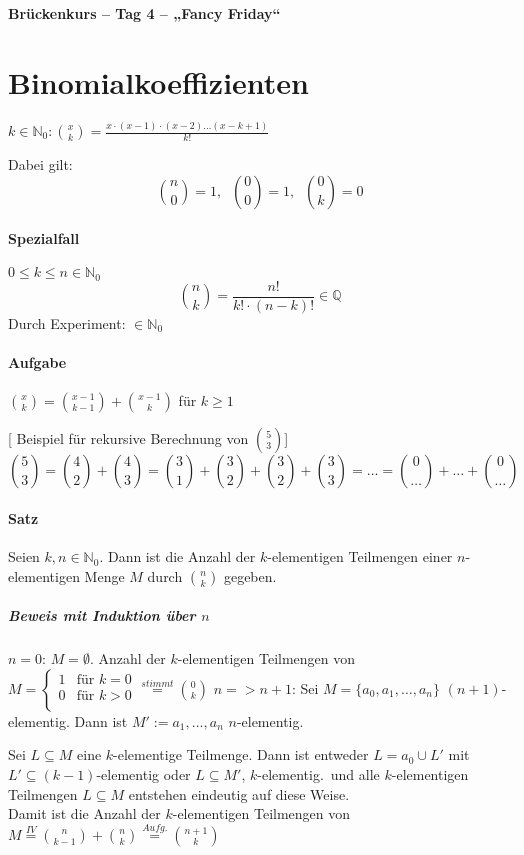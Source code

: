 \documentclass[14pt,a4paper]{article}
\begin{document}
	\begin{center}
		\Huge\textbf{Brückenkurs – Tag 4 – „Fancy Friday“}
	\end{center}
	\par

  \setcounter{section}{2}
	\section{Binomialkoeffizienten}
		$ k \in \mathbb{N}_0 : \binom{x}{k} = \frac{x \cdot (x-1) \cdot (x-2) \dots (x-k+1)}{k!} $

		Dabei gilt:
		$$ \binom{n}{0} = 1 ,\;\; \binom{0}{0} = 1,\;\; \binom{0}{k} = 0 $$

		\paragraph{Spezialfall} $ 0 \leq k \leq n \in \mathbb{N}_0 $
			$$ \binom{n}{k} = \frac{n!}{k! \cdot (n-k)!} \in \mathbb{Q} $$
			Durch Experiment: $ \in \mathbb{N}_0 $

		\paragraph{Aufgabe}
			$ \binom{x}{k} = \binom{x-1}{k-1} + \binom{x-1}{k} $ für $ k \geq 1 $

			[ Beispiel für rekursive Berechnung von $\binom{5}{3} $]
			$$ \binom{5}{3} = \binom{4}{2} + \binom{4}{3} = \binom{3}{1} + \binom{3}{2} + \binom{3}{2} + \binom{3}{3} = \dots = \binom{0}{\dots} + \dots + \binom{0}{\dots} $$

		\paragraph{Satz}
			Seien $k,n \in \mathbb{N}_0$. Dann ist die Anzahl der $k$-elementigen Teilmengen einer $n$-elementigen Menge $M$ durch $\binom{n}{k}$ gegeben.

			\subparagraph{Beweis mit Induktion über $n$}
				$n=0$: $M = \emptyset $. Anzahl der $k$-elementigen Teilmengen von $M = \begin{cases} 1 & \text{für } k = 0 \\ 0 & \text{für } k > 0 \\ \end{cases} \stackrel{stimmt}{=} \binom{0}{k} $
				$n => n+1$: Sei $M = \{a_0, a_1, \dots, a_n\}$ $(n+1)$-elementig.
				Dann ist $ M' := {a_1, \dots, a_n} $ $n$-elementig.

				Sei $ L \subseteq M $ eine $k$-elementige Teilmenge.
				Dann ist entweder $ L = {a_0} \cup L' $ mit $ L' \subseteq (k-1)$-elementig oder $ L \subseteq M'$, $k$-elementig.\
				und alle $k$-elementigen Teilmengen $L \subseteq M$ entstehen eindeutig auf diese Weise.\\
				Damit ist die Anzahl der $k$-elementigen Teilmengen von $M \stackrel{IV}{=} \binom{n}{k-1} + \binom{n}{k} \stackrel{Aufg.}{=} \binom{n+1}{k} $
\end{document}
